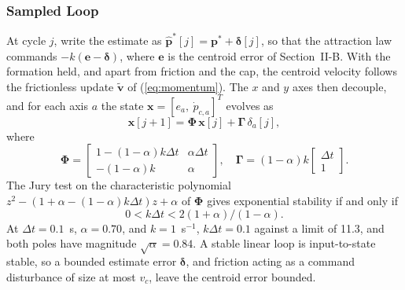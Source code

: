 \documentclass[lettersize,journal]{IEEEtran}
\newcommand{\rev}[1]{#1}                             %
\begin{document}
\subsubsection{Sampled Loop}
At cycle $j$, write the estimate as $\hat{\mathbf{p}}^*[j] = \mathbf{p}^* + \boldsymbol{\delta}[j]$, so that the attraction law commands $-k(\mathbf{e} - \boldsymbol{\delta})$, where $\mathbf{e}$ is the centroid error of Section~II-B. With the formation held, and apart from friction and the cap, the centroid velocity follows the frictionless update $\tilde{\mathbf{v}}$ of (\ref{eq:momentum}). The $x$ and $y$ axes then decouple, and for each axis $a$ the state $\mathbf{x} = [e_a,\ \dot{p}_{c,a}]^T$ evolves as
\begin{equation}\label{eq:cl}
\mathbf{x}[j{+}1] = \boldsymbol{\Phi}\,\mathbf{x}[j] + \boldsymbol{\Gamma}\,\delta_a[j],
\end{equation}
where
\[
\boldsymbol{\Phi} = \begin{bmatrix} 1{-}(1{-}\alpha)k\Delta t & \alpha\Delta t \\ -(1{-}\alpha)k & \alpha \end{bmatrix}, \quad \boldsymbol{\Gamma} = (1{-}\alpha)k\begin{bmatrix}\Delta t\\ 1\end{bmatrix}.
\]
The Jury test on the characteristic polynomial $z^2 - (1 + \alpha - (1-\alpha)k\Delta t)z + \alpha$ of $\boldsymbol{\Phi}$ gives exponential stability if and only if
\begin{equation}\label{eq:kmax}
0 < k\Delta t < 2(1+\alpha)/(1-\alpha).
\end{equation}
At $\Delta t = 0.1$~s, $\alpha = 0.70$, and $k = 1$~s$^{-1}$, $k\Delta t = 0.1$ against a limit of \rev{11.3}, and both poles have magnitude $\sqrt{\alpha} = \rev{0.84}$. %
A stable linear loop is input-to-state stable, so a bounded estimate error $\boldsymbol{\delta}$, and friction acting as a command disturbance of size at most $v_c$, leave the centroid error bounded.
\end{document}
